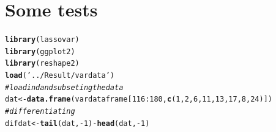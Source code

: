 \documentclass[11pt,oneside, a4paper]{amsart}\usepackage[]{graphicx}\usepackage[]{color}
\makeatletter
\newcommand{\hlnum}[1]{\textcolor[rgb]{0.686,0.059,0.569}{#1}}%
\newcommand{\hlstr}[1]{\textcolor[rgb]{0.192,0.494,0.8}{#1}}%
\newcommand{\hlcom}[1]{\textcolor[rgb]{0.678,0.584,0.686}{\textit{#1}}}%
\newcommand{\hlopt}[1]{\textcolor[rgb]{0,0,0}{#1}}%
\newcommand{\hlstd}[1]{\textcolor[rgb]{0.345,0.345,0.345}{#1}}%
\newcommand{\hlkwb}[1]{\textcolor[rgb]{0.69,0.353,0.396}{#1}}%
\newcommand{\hlkwd}[1]{\textcolor[rgb]{0.737,0.353,0.396}{\textbf{#1}}}%
\newenvironment{kframe}{%
 \def\at@end@of@kframe{}%
 \ifinner\ifhmode%
  \def\at@end@of@kframe{\end{minipage}}%
  \begin{minipage}{\columnwidth}%
 \fi\fi%
 \def\FrameCommand##1{\hskip\@totalleftmargin \hskip-\fboxsep
 \colorbox{shadecolor}{##1}\hskip-\fboxsep
     \hskip-\linewidth \hskip-\@totalleftmargin \hskip\columnwidth}%
 \MakeFramed {\advance\hsize-\width
   \@totalleftmargin\z@ \linewidth\hsize
   \@setminipage}}%
 {\par\unskip\endMakeFramed%
 \at@end@of@kframe}
\newenvironment{knitrout}{}{} %
\makeatother
\begin{document}
\section*{Some tests}


\begin{knitrout}
\color{fgcolor}\begin{kframe}
\begin{alltt}
\hlkwd{library}\hlstd{(lassovar)}
\hlkwd{library}\hlstd{(ggplot2)}
\hlkwd{library}\hlstd{(reshape2)}
\hlkwd{load}\hlstd{(}\hlstr{'../Result/vardata'}\hlstd{)}
\hlcom{# loadind and subseting the data}
\hlstd{dat} \hlkwb{<-} \hlkwd{data.frame}\hlstd{(vardataframe[}\hlnum{116}\hlopt{:}\hlnum{180}\hlstd{,} \hlkwd{c}\hlstd{(}\hlnum{1}\hlstd{,}\hlnum{2}\hlstd{,}\hlnum{6}\hlstd{,}\hlnum{11}\hlstd{,}\hlnum{13}\hlstd{,}\hlnum{17}\hlstd{,}\hlnum{8}\hlstd{,}\hlnum{24}\hlstd{) ])}
\hlcom{# differentiating}
\hlstd{difdat} \hlkwb{<-} \hlkwd{tail}\hlstd{(dat,}\hlopt{-}\hlnum{1}\hlstd{)} \hlopt{-} \hlkwd{head}\hlstd{(dat,}\hlopt{-}\hlnum{1}\hlstd{)}
\end{alltt}
\end{kframe}
\end{knitrout}
\end{document}
